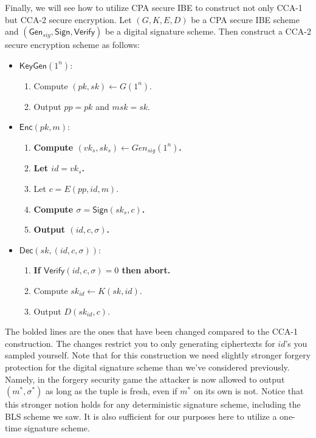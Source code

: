 Finally, we will see how to utilize CPA secure IBE to construct not only CCA-1 but CCA-2 secure encryption. 
Let $(G, K, E, D)$ be a CPA secure IBE scheme and $(\mathsf{Gen}_{sig}, \mathsf{Sign}, \mathsf{Verify})$ be a digital signature scheme. 
Then construct a CCA-2 secure encryption scheme as follows: 
\begin{itemize}
    \item $\mathsf{KeyGen}(1^n)$: 
    \begin{enumerate}
        \item Compute $(pk, sk) \leftarrow G(1^n)$. 
        
        \item Output $pp = pk$ and $msk = sk$. 
    \end{enumerate}

    \item $\mathsf{Enc}(pk, m)$: 
    \begin{enumerate}
        \item \textbf{Compute $(vk_s, sk_s) \leftarrow Gen_{sig}(1^n)$.}
        
        \item \textbf{Let $id = vk_s$.}

        \item Let $c = E(pp, id, m)$. 

        \item \textbf{Compute $\sigma = \mathsf{Sign}(sk_s, c)$.} 

        \item \textbf{Output $(id, c, \sigma)$.} 
    \end{enumerate}

    \item $\mathsf{Dec}(sk, (id,c,\sigma))$: 
    \begin{enumerate}
        \item \textbf{If $\mathsf{Verify}(id, c, \sigma) = 0$ then abort.} 

        \item Compute $sk_{id} \leftarrow K(sk, id)$. 

        \item Output $D(sk_{id}, c)$. 
    \end{enumerate}
\end{itemize}
The bolded lines are the ones that have been changed compared to the CCA-1 construction. 
The changes restrict you to only generating ciphertexts for $id$'s you sampled yourself. 
Note that for this construction we need slightly stronger forgery protection for the digital signature scheme than we've considered previously. 
Namely, in the forgery security game the attacker is now allowed to output $(m^*, \sigma^*)$ as long as the tuple is fresh, even if $m^*$ on its own is not. 
Notice that this stronger notion holds for any deterministic signature scheme, including the BLS scheme we saw. 
It is also sufficient for our purposes here to utilize a one-time signature scheme. 